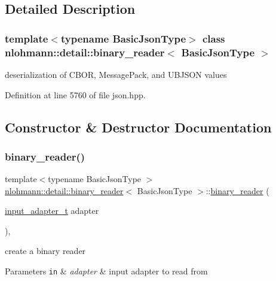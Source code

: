 \subsection{Detailed Description}
\subsubsection*{template$<$typename Basic\+Json\+Type$>$\newline
class nlohmann\+::detail\+::binary\+\_\+reader$<$ Basic\+Json\+Type $>$}

deserialization of C\+B\+OR, Message\+Pack, and U\+B\+J\+S\+ON values 

Definition at line 5760 of file json.\+hpp.



\subsection{Constructor \& Destructor Documentation}
\mbox{\label{classnlohmann_1_1detail_1_1binary__reader_a7e643baadaf4c31718cd74833bdd542f}} 
\subsubsection{\texorpdfstring{binary\+\_\+reader()}{binary\_reader()}}
{\footnotesize\ttfamily template$<$typename Basic\+Json\+Type $>$ \\
\hyperlink{classnlohmann_1_1detail_1_1binary__reader}{nlohmann\+::detail\+::binary\+\_\+reader}$<$ Basic\+Json\+Type $>$\+::\hyperlink{classnlohmann_1_1detail_1_1binary__reader}{binary\+\_\+reader} (\begin{DoxyParamCaption}\item[{\hyperlink{namespacenlohmann_1_1detail_ae132f8cd5bb24c5e9b40ad0eafedf1c2}{input\+\_\+adapter\+\_\+t}}]{adapter }\end{DoxyParamCaption})\hspace{0.3cm}{\ttfamily [inline]}, {\ttfamily [explicit]}}



create a binary reader 


\begin{DoxyParams}[1]{Parameters}
\mbox{\tt in}  & {\em adapter} & input adapter to read from \\
\hline
\end{DoxyParams}


